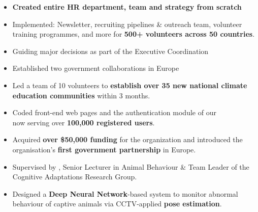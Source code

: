 \documentclass[10pt,a4paper,ragged2e,withhyper]{altacv}
\begin{document}
\begin{paracol}{2}


\begin{itemize}
    \item \textbf{Created entire HR department, team and strategy from scratch}
    \item Implemented: Newsletter, recruiting pipelines \& outreach team, volunteer training programmes, and more for \textbf{500+ volunteers across 50 countries}.
    \item Guiding major decisions as part of the Executive Coordination
\end{itemize}

\divider

\begin{itemize}
    \item Established two government collaborations in Europe
    \item Led a team of 10 volunteers to \textbf{establish over 35 new national climate education communities} within 3 months.
\end{itemize}

\divider

\begin{itemize}
    \item Coded front-end web pages and the authentication module of our\\  now serving over \textbf{100,000 registered users}.
    \item Acquired \textbf{over \$50,000 funding} for the organization and introduced the organisation's \textbf{first government partnership} in Europe.
\end{itemize}
 

\begin{itemize}
    \item Supervised by , Senior Lecturer in Animal Behaviour \& Team Leader of the Cognitive Adaptations Research Group.
    \item Designed a \textbf{Deep Neural Network}-based system to monitor abnormal behaviour of captive animals via CCTV-applied \textbf{pose estimation}.
\end{itemize}


\end{paracol}
\end{document}
